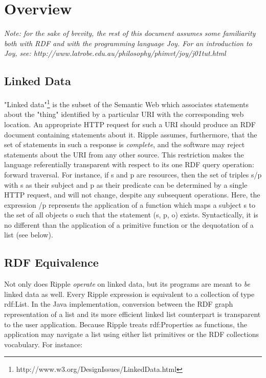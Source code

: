 \documentclass[runningheads]{llncs}
\begin{document}
\section{Overview}

{\it Note: for the sake of brevity, the rest of this document assumes some familiarity both with RDF and with the programming language Joy.  For an introduction to Joy, see: http://www.latrobe.edu.au/philosophy/phimvt/joy/j01tut.html}

\subsection{Linked Data}

"Linked data"\footnote{http://www.w3.org/DesignIssues/LinkedData.html} is the subset of the Semantic Web which associates statements about the "thing" identified by a particular URI with the corresponding web location.  An appropriate HTTP request for such a URI should produce an RDF document containing statements about it.  Ripple assumes, furthermore, that the set of statements in such a response is \emph{complete}, and the software may reject statements about the URI from any other source.  This restriction makes the language referentially transparent with respect to its one RDF query operation: forward traversal.  For instance, if s and p are resources, then the set of triples s/p with s as their subject and p as their predicate can be determined by a single HTTP request, and will not change, despite any subsequent operations.  Here, the expression /p represents the application of a function which maps a subject s to the set of all objects o such that the statement (s, p, o) exists.  Syntactically, it is no different than the application of a primitive function or the dequotation of a list (see below).

\subsection{RDF Equivalence}

Not only does Ripple \emph{operate} on linked data, but its programs are meant to \emph{be} linked data as well.  Every Ripple expression is equivalent to a collection of type rdf:List.  In the Java implementation, conversion between the RDF graph representation of a list and its more efficient linked list counterpart is transparent to the user application.  Because Ripple treats rdf:Properties as functions, the application may navigate a list using either list primitives or the RDF collections
vocabulary.  For instance:
\end{document}
